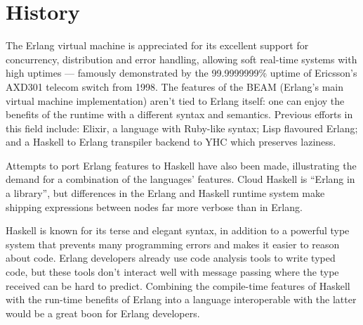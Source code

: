 \section{History}

The Erlang virtual machine is appreciated for its excellent support for
concurrency, distribution and error handling, allowing soft real-time systems
with high uptimes --- famously demonstrated by the 99.9999999\% uptime of
Ericsson’s AXD301 telecom switch from 1998\cite{ninenines}. The features of the BEAM (Erlang’s
main virtual machine implementation) aren't tied to Erlang itself: one can
enjoy the benefits of the runtime with a different syntax and semantics.
Previous efforts in this field include: Elixir\cite{elixir}, a language with Ruby-like
syntax; Lisp flavoured Erlang\cite{lfe}; and a Haskell to Erlang transpiler backend to YHC\cite{yhc} which preserves laziness. 

Attempts to port Erlang features to Haskell have also been made, illustrating
the demand for a combination of the languages' features. Cloud Haskell\cite{cloudhaskell} is
``Erlang in a library'', but differences in the Erlang and Haskell runtime
system make shipping expressions between nodes far more verbose than in Erlang.

Haskell is known for its terse and elegant syntax, in addition to a powerful
type system that prevents many programming errors and makes it easier to
reason about code. Erlang developers already use code analysis tools to write
typed code, but these tools don’t interact well with message passing where the type received can be hard to predict. Combining the compile-time features of Haskell with the run-time benefits of Erlang into a language interoperable with the latter would be a great boon for Erlang developers.

